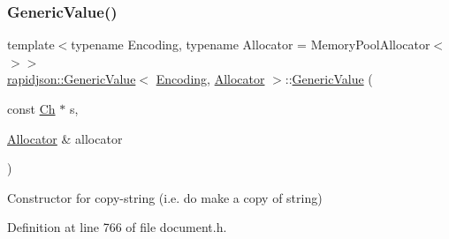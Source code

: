 \subsubsection{\texorpdfstring{GenericValue()}{GenericValue()}\hspace{0.1cm}{\footnotesize\ttfamily [15/17]}}
{\footnotesize\ttfamily template$<$typename Encoding, typename Allocator = Memory\+Pool\+Allocator$<$$>$$>$ \\
\mbox{\hyperlink{classrapidjson_1_1_generic_value}{rapidjson\+::\+Generic\+Value}}$<$ \mbox{\hyperlink{classrapidjson_1_1_encoding}{Encoding}}, \mbox{\hyperlink{classrapidjson_1_1_allocator}{Allocator}} $>$\+::\mbox{\hyperlink{classrapidjson_1_1_generic_value}{Generic\+Value}} (\begin{DoxyParamCaption}\item[{const \mbox{\hyperlink{classrapidjson_1_1_generic_value_adcdbc7fa85a9a41b78966d7e0dcc2ac4}{Ch}} $\ast$}]{s,  }\item[{\mbox{\hyperlink{classrapidjson_1_1_allocator}{Allocator}} \&}]{allocator }\end{DoxyParamCaption})}



Constructor for copy-\/string (i.\+e. do make a copy of string) 



Definition at line 766 of file document.\+h.


\begin{DoxyCode}{0}

\end{DoxyCode}
\mbox{\label{classrapidjson_1_1_generic_value_a77b0f41557b3c34b57a180698312c4a8}} 
